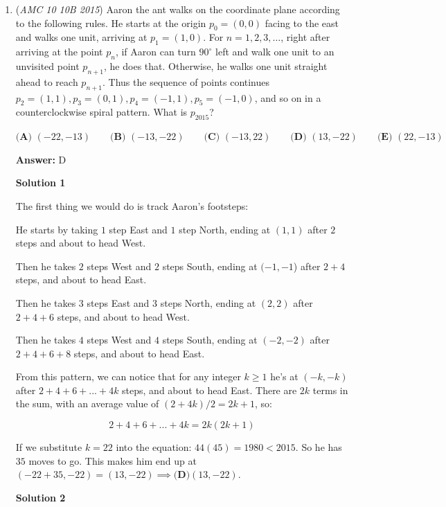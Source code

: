 \begin{enumerate}
 -\href{https://artofproblemsolving.com/wiki/index.php?title=User:Yiyj1&action=edit&redlink=1}{Yiyj1}

 


	\item (\textit{AMC 10 10B 2015}) Aaron the ant walks on the coordinate plane according to the following rules. He starts at the origin $p_0=(0,0)$ facing to the east and walks one unit, arriving at $p_1=(1,0)$. For $n=1,2,3,\dots$, right after arriving at the point $p_n$, if Aaron can turn $90^\circ$ left and walk one unit to an unvisited point $p_{n+1}$, he does that. Otherwise, he walks one unit straight ahead to reach $p_{n+1}$. Thus the sequence of points continues $p_2=(1,1), p_3=(0,1), p_4=(-1,1), p_5=(-1,0)$, and so on in a counterclockwise spiral pattern. What is $p_{2015}$?


 $\textbf{(A) } (-22,-13)\qquad\textbf{(B) } (-13,-22)\qquad\textbf{(C) } (-13,22)\qquad\textbf{(D) } (13,-22)\qquad\textbf{(E) } (22,-13)$

 \textbf{Answer: }D



\textbf{Solution 1}

The first thing we would do is track Aaron's footsteps:

 He starts by taking $1$ step East and $1$ step North, ending at $(1,1)$ after $2$ steps and about to head West.

 Then he takes $2$ steps West and $2$ steps South, ending at $(-1,-1$) after $2+4$ steps, and about to head East.

 Then he takes $3$ steps East and $3$ steps North, ending at $(2,2)$ after $2+4+6$ steps, and about to head West.

 Then he takes $4$ steps West and $4$ steps South, ending at $(-2,-2)$ after $2+4+6+8$ steps, and about to head East.

 From this pattern, we can notice that for any integer $k \ge 1$ he's at $(-k, -k)$ after $2 + 4 + 6 + ... + 4k$ steps, and about to head East.  There are $2k$ terms in the sum, with an average value of $(2 + 4k)/2 = 2k + 1$, so:

 
 \[2 + 4 + 6 + ... + 4k = 2k(2k + 1)\]

 If we substitute $k = 22$ into the equation:  $44(45) = 1980 < 2015$.  So he has $35$ moves to go.  This makes him end up at $(-22+35,-22) = (13,-22) \implies \boxed{\textbf{(D)} (13, -22)}$.

 



\textbf{Solution 2}


\end{enumerate}
